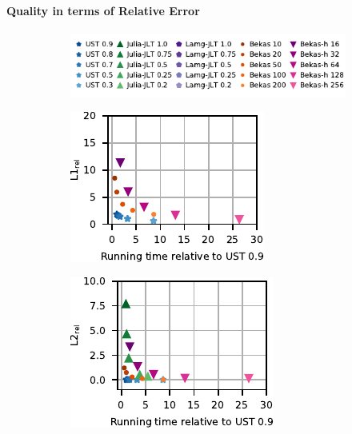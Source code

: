 \paragraph{Quality in terms of Relative Error}
\begin{figure}[tb]
\centering
\begin{subfigure}{\textwidth}
\centering
\includegraphics{sources/plots/el-clos/legend-quality.pdf}
\end{subfigure}\smallskip

\begin{subfigure}{.3\textwidth}
\centering
\includegraphics[width=\textwidth]{sources/plots/el-clos/l1-norm.pdf}
\end{subfigure}\hfill
\begin{subfigure}{.3\textwidth}
\centering
\includegraphics[width=\textwidth]{sources/plots/el-clos/l2-norm.pdf}

\end{subfigure}
\end{figure}
